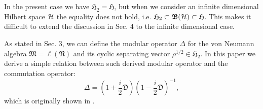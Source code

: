 In the present case we have $\mathfrak{H}_2=\mathfrak{H}$, but when we consider an infinite
dimensional Hilbert space ${\cal H}$ the equality does not hold, i.e. $\mathfrak{H}_2\subset \mathfrak{B}({\cal H})\subset \mathfrak{H}$. This makes it difficult to extend the discussion in Sec. 4 to the infinite dimensional case.

As stated in Sec. 3, we can define the
modular operator $\Delta$ for the von Neumann algebra $\mathfrak{M}=\ell(\mathfrak{N})$ and its cyclic separating vector $\rho^{1/2} \in \mathfrak{H}_2$. 
In this paper we derive a simple relation between such derived modular operator and the commutation operator:
$$
    \Delta=\left(1+\frac{i}{2}\mathfrak{D}\right)\left(1-\frac{i}{2}\mathfrak{D}\right)^{-1},
$$
which is originally shown in \cite{Holevo_1977}.
